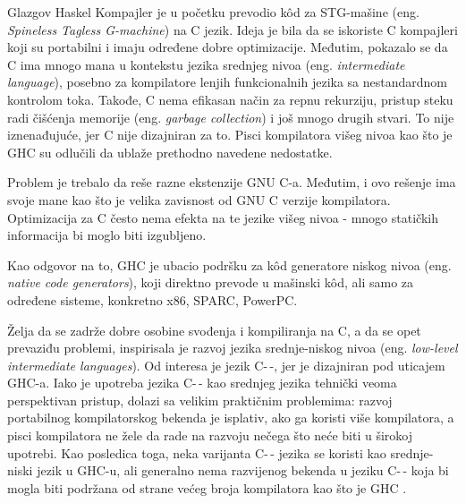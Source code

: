 Glazgov Haskel Kompajler je u početku prevodio k\^{o}d za STG-mašine (eng. \emph{Spineless Tagless G-machine}) na C jezik. Ideja je bila da se iskoriste C kompajleri koji su portabilni i imaju određene dobre optimizacije. Međutim, pokazalo se da C ima mnogo mana u kontekstu jezika srednjeg nivoa (eng. \emph {intermediate language}), posebno za kompilatore lenjih funkcionalnih jezika sa nestandardnom kontrolom toka. Takođe, C nema efikasan način za repnu rekurziju, pristup steku radi čišćenja memorije (eng. \emph{garbage collection}) i još mnogo drugih stvari. To nije iznenađujuće, jer C nije dizajniran za to. Pisci kompilatora višeg nivoa kao što je GHC su odlučili da ublaže prethodno navedene nedostatke.

Problem je trebalo da reše razne ekstenzije GNU C-a. Međutim, i ovo rešenje ima svoje mane kao što je velika zavisnost od GNU C verzije kompilatora. Optimizacija za C često nema efekta na te jezike višeg nivoa - mnogo statičkih informacija bi moglo biti izgubljeno. 

Kao odgovor na to, GHC je ubacio podršku za k\^{o}d generatore niskog nivoa (eng. \emph{native code generators}), koji direktno prevode u mašinski k\^{o}d, ali samo za određene sisteme, konkretno x86, SPARC, PowerPC.

Želja da se zadrže dobre osobine svođenja i kompiliranja na C, a da se opet prevaziđu problemi, inspirisala je razvoj jezika srednje-niskog nivoa (eng. \emph{low-level intermediate languages}). Od interesa je jezik C-\,-, jer je dizajniran pod uticajem GHC-a. Iako je upotreba jezika C-\,- kao srednjeg jezika tehnički veoma perspektivan pristup, dolazi sa velikim praktičnim problemima: razvoj portabilnog kompilatorskog bekenda je isplativ, ako ga koristi više kompilatora, a pisci kompilatora ne žele da rade na razvoju nečega što neće biti u širokoj upotrebi. Kao posledica toga, neka varijanta C-\,- jezika se koristi kao srednje-niski jezik u GHC-u, ali generalno nema razvijenog bekenda u jeziku C-\,- koja bi mogla biti podržana od strane većeg broja kompilatora kao što je GHC \cite{SPJ92}.

